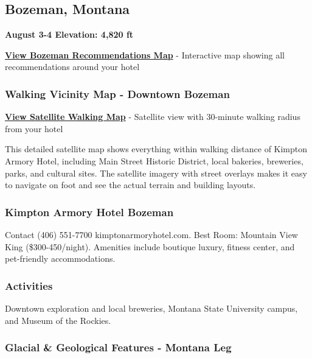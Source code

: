 \documentclass[
  11pt,
  letterpaper,
  DIV=10,
  numbers=noendperiod]{scrartcl}
\begin{document}
\subsection{Bozeman, Montana}\label{bozeman-montana-1}

\textbf{August 3-4 \textbar{} Elevation: 4,820 ft}

\textbf{\href{images/bozeman_montana_recommendations_map.html}{View
Bozeman Recommendations Map}} - Interactive map showing all
recommendations around your hotel

\subsubsection{Walking Vicinity Map - Downtown
Bozeman}\label{walking-vicinity-map---downtown-bozeman}

\textbf{\href{images/bozeman_mt_walking_map.html}{View Satellite Walking
Map}} - Satellite view with 30-minute walking radius from your hotel

This detailed satellite map shows everything within walking distance of
Kimpton Armory Hotel, including Main Street Historic District, local
bakeries, breweries, parks, and cultural sites. The satellite imagery
with street overlays makes it easy to navigate on foot and see the
actual terrain and building layouts.

\subsubsection{Kimpton Armory Hotel
Bozeman}\label{kimpton-armory-hotel-bozeman}

Contact (406) 551-7700 \textbar{} kimptonarmoryhotel.com. Best Room:
Mountain View King (\$300-450/night). Amenities include boutique luxury,
fitness center, and pet-friendly accommodations.

\subsubsection{Activities}\label{activities}

Downtown exploration and local breweries, Montana State University
campus, and Museum of the Rockies.

\subsubsection{Glacial \& Geological Features - Montana
Leg}\label{glacial-geological-features---montana-leg}
\end{document}
